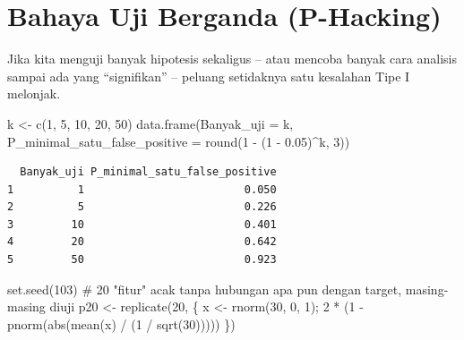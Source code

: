 \documentclass[
  indonesian,
  letterpaper,
]{book}
\newenvironment{Shaded}{\begin{snugshade}}{\end{snugshade}}
\newcommand{\AttributeTok}[1]{\textcolor[rgb]{0.40,0.45,0.13}{#1}}
\newcommand{\CommentTok}[1]{\textcolor[rgb]{0.37,0.37,0.37}{#1}}
\newcommand{\DecValTok}[1]{\textcolor[rgb]{0.68,0.00,0.00}{#1}}
\newcommand{\FloatTok}[1]{\textcolor[rgb]{0.68,0.00,0.00}{#1}}
\newcommand{\FunctionTok}[1]{\textcolor[rgb]{0.28,0.35,0.67}{#1}}
\newcommand{\NormalTok}[1]{\textcolor[rgb]{0.00,0.23,0.31}{#1}}
\newcommand{\OtherTok}[1]{\textcolor[rgb]{0.00,0.23,0.31}{#1}}
\newcommand{\SpecialCharTok}[1]{\textcolor[rgb]{0.37,0.37,0.37}{#1}}
\begin{document}
\section{Bahaya Uji Berganda
(P-Hacking)}\label{bahaya-uji-berganda-p-hacking}

Jika kita menguji banyak hipotesis sekaligus -- atau mencoba banyak cara
analisis sampai ada yang ``signifikan'' -- peluang setidaknya satu
kesalahan Tipe I melonjak.

\begin{Shaded}
\begin{Highlighting}[]
\NormalTok{k }\OtherTok{\textless{}{-}} \FunctionTok{c}\NormalTok{(}\DecValTok{1}\NormalTok{, }\DecValTok{5}\NormalTok{, }\DecValTok{10}\NormalTok{, }\DecValTok{20}\NormalTok{, }\DecValTok{50}\NormalTok{)}
\FunctionTok{data.frame}\NormalTok{(}\AttributeTok{Banyak\_uji =}\NormalTok{ k, }\AttributeTok{P\_minimal\_satu\_false\_positive =} \FunctionTok{round}\NormalTok{(}\DecValTok{1} \SpecialCharTok{{-}}\NormalTok{ (}\DecValTok{1} \SpecialCharTok{{-}} \FloatTok{0.05}\NormalTok{)}\SpecialCharTok{\^{}}\NormalTok{k, }\DecValTok{3}\NormalTok{))}
\end{Highlighting}
\end{Shaded}

\begin{verbatim}
  Banyak_uji P_minimal_satu_false_positive
1          1                         0.050
2          5                         0.226
3         10                         0.401
4         20                         0.642
5         50                         0.923
\end{verbatim}

\begin{Shaded}
\begin{Highlighting}[]
\FunctionTok{set.seed}\NormalTok{(}\DecValTok{103}\NormalTok{)}
\CommentTok{\# 20 "fitur" acak tanpa hubungan apa pun dengan target, masing{-}masing diuji}
\NormalTok{p20 }\OtherTok{\textless{}{-}} \FunctionTok{replicate}\NormalTok{(}\DecValTok{20}\NormalTok{, \{ x }\OtherTok{\textless{}{-}} \FunctionTok{rnorm}\NormalTok{(}\DecValTok{30}\NormalTok{, }\DecValTok{0}\NormalTok{, }\DecValTok{1}\NormalTok{); }\DecValTok{2} \SpecialCharTok{*}\NormalTok{ (}\DecValTok{1} \SpecialCharTok{{-}} \FunctionTok{pnorm}\NormalTok{(}\FunctionTok{abs}\NormalTok{(}\FunctionTok{mean}\NormalTok{(x) }\SpecialCharTok{/}\NormalTok{ (}\DecValTok{1} \SpecialCharTok{/} \FunctionTok{sqrt}\NormalTok{(}\DecValTok{30}\NormalTok{))))) \})}
\end{Highlighting}
\end{Shaded}
\end{document}
